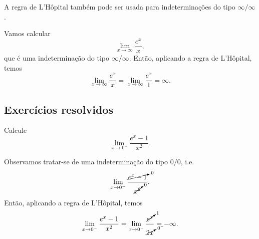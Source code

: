 \begin{obs}
  A regra de L'Hôpital também pode ser usada para indeterminações do tipo $\infty/\infty$.
\end{obs}

\begin{ex}
  Vamos calcular
  \begin{equation}
    \lim_{x\to \infty} \frac{e^x}{x},
  \end{equation}
  que é uma indeterminação do tipo $\infty/\infty$. Então, aplicando a regra de L'Hôpital, temos
  \begin{equation}
    \lim_{x\to \infty} \frac{e^x}{x} = \lim_{x\to \infty} \frac{e^x}{1} = \infty.
  \end{equation}
\end{ex}

\subsection*{Exercícios resolvidos}

\begin{exeresol}
  Calcule
  \begin{equation}
    \lim_{x\to 0^-} \frac{e^x-1}{x^2}.
  \end{equation}
\end{exeresol}
\begin{resol}
  Observamos tratar-se de uma indeterminação do tipo $0/0$, i.e.
  \begin{equation}
    \lim_{x\to 0^-} \frac{\cancelto{0}{e^x-1}}{\cancelto{0}{x^2}}.
  \end{equation}
  Então, aplicando a regra de L'Hôpital, temos
  \begin{equation}
    \lim_{x\to 0^-} \frac{e^x-1}{x^2} = \lim_{x\to 0^-} \frac{\cancelto{1}{e^x}}{\cancelto{0^-}{2x}} = -\infty.
  \end{equation}
\end{resol}

